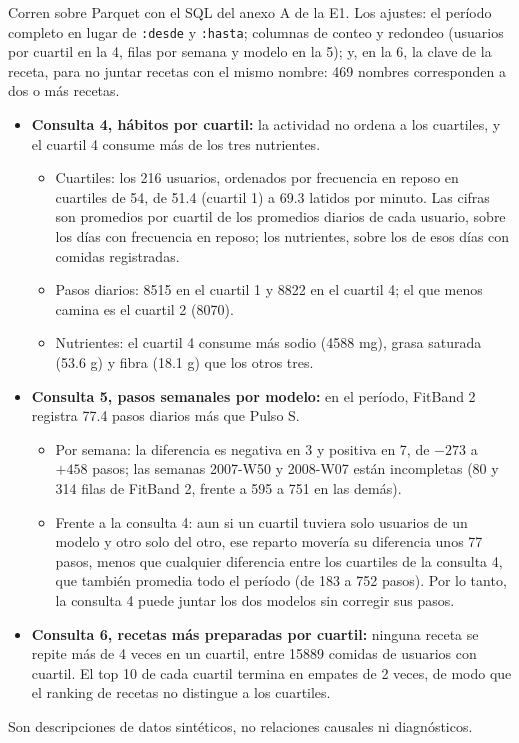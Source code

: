 \documentclass[11pt]{article}
\begin{document}
 Corren sobre
Parquet con el SQL del anexo A de la E1. Los ajustes: el período completo en lugar de
\texttt{:desde} y \texttt{:hasta}; columnas de conteo y redondeo (usuarios por
cuartil en la 4, filas por semana y modelo en la 5); y, en la 6, la clave de la
receta, para no juntar recetas con el mismo nombre: 469 nombres corresponden a
dos o más recetas.
\begin{itemize}
  \item \textbf{Consulta 4, hábitos por cuartil:} la actividad no ordena a
  los cuartiles, y el cuartil 4 consume más de los tres nutrientes.
  \begin{itemize}
    \item Cuartiles: los 216 usuarios, ordenados por frecuencia en reposo en
    cuartiles de 54, de 51.4 (cuartil 1) a 69.3 latidos por minuto. Las
    cifras son promedios por cuartil de los promedios diarios de cada usuario,
    sobre los días con frecuencia en reposo; los nutrientes, sobre los de esos
    días con comidas registradas.
    \item Pasos diarios: 8515 en el cuartil 1 y 8822 en el cuartil 4; el que
    menos camina es el cuartil 2 (8070).
    \item Nutrientes: el cuartil 4 consume más sodio (4588 mg), grasa saturada
    (53.6 g) y fibra (18.1 g) que los otros tres.
  \end{itemize}
  \item \textbf{Consulta 5, pasos semanales por modelo:} en el período,
  FitBand 2 registra 77.4 pasos diarios más que Pulso S.
  \begin{itemize}
    \item Por semana: la diferencia es negativa en 3 y positiva en 7, de
    $-273$ a $+458$ pasos; las semanas 2007-W50 y 2008-W07 están incompletas
    (80 y 314 filas de FitBand 2, frente a 595 a 751 en las demás).
    \item Frente a la consulta 4: aun si un cuartil tuviera solo usuarios de
    un modelo y otro solo del otro, ese reparto movería su diferencia unos 77
    pasos, menos que cualquier diferencia entre los cuartiles de la consulta
    4, que también promedia todo el período (de 183 a 752 pasos). Por lo
    tanto, la consulta 4 puede juntar los dos modelos sin corregir sus pasos.
  \end{itemize}
  \item \textbf{Consulta 6, recetas más preparadas por cuartil:} ninguna receta se repite más de 4 veces en un
  cuartil, entre 15889 comidas de usuarios con cuartil. El top 10 de cada cuartil termina en
  empates de 2 veces, de modo que el ranking de recetas no distingue a los
  cuartiles.
\end{itemize}
Son descripciones de datos sintéticos, no relaciones causales ni
diagnósticos.
\end{document}
